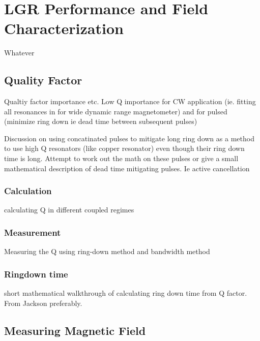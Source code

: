 
\chapter{LGR Performance and Field Characterization}

Whatever

\section{Quality Factor}

Qualtiy factor importance etc. Low Q importance for CW application (ie. fitting all resonances in for wide dynamic range magnetometer) and for pulsed (minimize ring down ie dead time between subsequent pulses)

Discussion on using concatinated pulses to mitigate long ring down as a method to use high Q resonators (like copper resonator) even though their ring down time is long. Attempt to work out the math on these pulses or give a small mathematical description of dead time mitigating pulses. Ie active cancellation

\subsection{Calculation}

calculating Q in different coupled regimes

\subsection{Measurement}

Measuring the Q using ring-down method and bandwidth method

\subsection{Ringdown time}

short mathematical walkthrough of calculating ring down time from Q factor. From Jackson preferably.


\section{Measuring Magnetic Field}

